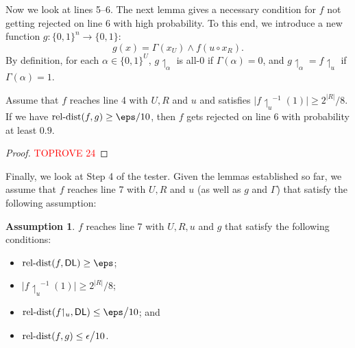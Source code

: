 \documentclass[11pt]{article}
\theoremstyle{definition}
\newtheorem{assumption}{Assumption}
\begin{document}
Now we look at lines 5--6. 
The next lemma gives a necessary condition
  for $f$ not getting rejected on line {6}
with high probability.
To this end, we introduce a new function
$g:\{0,1\}^n\rightarrow \{0,1\}$:
$$
g(x)=\Gamma(x_U) {\wedge} f(u\circ x_R).
$$  
By definition, for each $\alpha\in \{0,1\}^U$, $g{\upharpoonleft_{\alpha}}$ is all-$0$ if $\Gamma(\alpha)=0$, and $g{\upharpoonleft_{\alpha}}=f{\upharpoonleft_{ u}}$ if $\Gamma(\alpha)=1$.
\begin{lemma}\label{thm: f close to g (DL case)}
Assume that $f$ reaches line 4 with $U,R$ and $u$ and satisfies 
  $ |f{\upharpoonleft_{u}}^{-1}(1)|\ge 2^{|R|}/8.$
If we have $\reldist(f,g) \geq \eps/10$,
  then $f$ gets rejected on line 6 with probability at least $0.9$.
\end{lemma}
\begin{proof}\textcolor{red}{TOPROVE 24}\end{proof}

Finally, we look at Step 4 of the tester. 
Given the lemmas established so far, we assume that $f$ reaches line 7 with $U,R$ and $u$ (as well as $g$ and $\Gamma$) that satisfy the following assumption:

\begin{assumption}\label{assumption: fu dense + close to g}
$f$ reaches line 7 with $U,R,u$ and $g$ that satisfy the following conditions:
    \begin{itemize}
    \item $\reldist(f,\textsf{DL})\ge \eps$;
        \item $\big|f{\upharpoonleft_{ u}}^{-1}(1)\big| \geq 2^{| R|}\big/8 $;
        \item $\reldist(f{\upharpoonleft_{u}},\textsf{DL})\le \eps\big/10 $; and
        \item $\mathrm{rel}\text{-}\mathrm{dist}(f, g)\leq \epsilon\big/10$.
\end{itemize}
\end{assumption}
\end{document}
